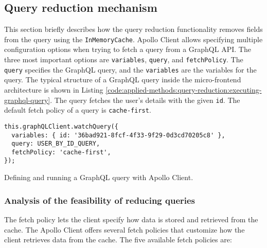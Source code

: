 \subsection{Query reduction mechanism}\label{subsection:applied-methods:query-reduction:how-does-the-library-work}

This section briefly describes how the query reduction functionality removes fields from the query using the \texttt{InMemoryCache}. Apollo Client allows specifying multiple configuration options when trying to fetch a query from a GraphQL \ac{API}. The three most important options are \texttt{variables}, \texttt{query}, and \texttt{fetchPolicy}. The \texttt{query} specifies the GraphQL query, and the \texttt{variables} are the variables for the query. The typical structure of a GraphQL query inside the micro-frontend architecture is shown in Listing \ref{code:applied-methods:query-reduction:executing-graphql-query}. The query fetches the user's details with the given \texttt{id}. The default fetch policy of a query is \texttt{cache-first}.  

\ifshowListings
\begin{listing}[H]
\begin{verbatim}
this.graphQLClient.watchQuery({
  variables: { id: '36bad921-8fcf-4f33-9f29-0d3cd70205c8' },
  query: USER_BY_ID_QUERY,
  fetchPolicy: 'cache-first',
});
\end{verbatim}
\caption{Defining and running a GraphQL query with Apollo Client.}\label{code:applied-methods:query-reduction:executing-graphql-query}
\end{listing}
\fi

\subsubsection{Analysis of the feasibility of reducing queries}

The fetch policy lets the client specify how data is stored and retrieved from the cache. The Apollo Client offers several fetch policies that customize how the client retrieves data from the cache. The five available fetch policies are: \cite{misc:-:applied-methods:query-reduction:apollo-client:queries}

